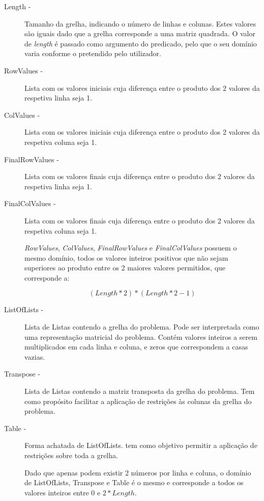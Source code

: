 \documentclass[11pt]{article}
\begin{document}
\begin{description}

\item[Length - ] Tamanho da grelha, indicando o número de linhas e colunas. Estes valores são iguais dado que a grelha corresponde a uma matriz quadrada. O valor de \emph{length} é passado como argumento do predicado, pelo que o seu domínio varia conforme o pretendido pelo utilizador.

\item[RowValues - ] Lista com os valores iniciais cuja diferença entre o produto dos 2 valores da respetiva linha seja 1.

\item[ColValues - ] Lista com os valores iniciais cuja diferença entre o produto dos 2 valores da respetiva coluna seja 1.

\item[FinalRowValues - ] Lista com os valores finais cuja diferença entre o produto dos 2 valores da respetiva linha seja 1.

\item[FinalColValues - ] Lista com os valores finais cuja diferença entre o produto dos 2 valores da respetiva coluna seja 1.

\emph{RowValues}, \emph{ColValues}, \emph{FinalRowValues} e \emph{FinalColValues} possuem o mesmo domínio, todos os valores inteiros positivos que não sejam superiores ao produto entre os 2 maiores valores permitidos, que corresponde a:

\[(Length *2)*(Length * 2 - 1)\]


\item[ListOfLists - ] Lista de Listas contendo a grelha do problema. Pode ser interpretada como uma representação matricial do problema. Contém valores inteiros a serem multiplicados em cada linha e coluna, e zeros que correspondem a casas vazias.

\item[Transpose - ] Lista de Listas contendo a matriz transposta da grelha do problema. Tem como propósito facilitar a aplicação de restrições às colunas da grelha do problema.

\item[Table - ] Forma achatada de ListOfLists. tem como objetivo permitir a aplicação de restrições sobre toda a grelha. 

Dado que apenas podem existir 2 números por linha e coluna, o domínio de ListOfLists, Transpose e Table é o mesmo e corresponde a todos os valores inteiros entre 0 e \(2*Length\).



\end{description}
\end{document}
